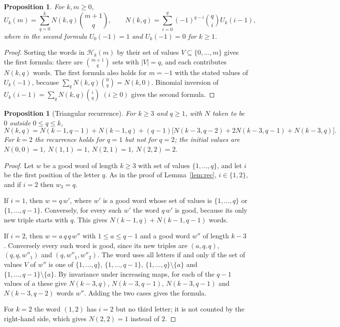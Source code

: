 \documentclass[11pt]{amsart}
\newtheorem{proposition}[theorem]{Proposition}
\theoremstyle{definition}
\begin{document}
\begin{proposition}\label{prop:Nbasis}
For $k,m\ge0$,
\begin{equation}\label{eq:Nbasis}
  U_k(m)=\sum_{q=0}^{k}N(k,q)\binom{m+1}{q},\qquad N(k,q)=\sum_{i=0}^{q}(-1)^{q-i}\binom{q}{i}U_k(i-1),
\end{equation}
where in the second formula $U_0(-1)=1$ and $U_k(-1)=0$ for $k\ge1$.
\end{proposition}

\begin{proof}
Sorting the words in $\mathcal H_k(m)$ by their set of values $V\subseteq\{0,\dots,m\}$ gives the first formula: there are $\binom{m+1}{q}$ sets with $|V|=q$, and each contributes $N(k,q)$ words. The first formula also holds for $m=-1$ with the stated values of $U_k(-1)$, because $\sum_qN(k,q)\binom{0}{q}=N(k,0)$. Binomial inversion of $U_k(i-1)=\sum_qN(k,q)\binom{i}{q}$ $(i\ge0)$ gives the second formula.
\end{proof}

\begin{proposition}[Triangular recurrence]\label{prop:Ntri}
For $k\ge3$ and $q\ge1$, with $N$ taken to be $0$ outside $0\le q\le k$,
\[
  N(k,q)=N(k-1,q-1)+N(k-1,q)+(q-1)\bigl[N(k-3,q-2)+2N(k-3,q-1)+N(k-3,q)\bigr].
\]
For $k=2$ the recurrence holds for $q=1$ but not for $q=2$; the initial values are $N(0,0)=1$, $N(1,1)=1$, $N(2,1)=1$, $N(2,2)=2$.
\end{proposition}

\begin{proof}
Let $w$ be a good word of length $k\ge3$ with set of values $\{1,\dots,q\}$, and let $i$ be the first position of the letter $q$. As in the proof of Lemma~\ref{lem:rec}, $i\in\{1,2\}$, and if $i=2$ then $w_3=q$.

If $i=1$, then $w=q\,w'$, where $w'$ is a good word whose set of values is $\{1,\dots,q\}$ or $\{1,\dots,q-1\}$. Conversely, for every such $w'$ the word $q\,w'$ is good, because its only new triple starts with $q$. This gives $N(k-1,q)+N(k-1,q-1)$ words.

If $i=2$, then $w=a\,q\,q\,w''$ with $1\le a\le q-1$ and a good word $w''$ of length $k-3$. Conversely every such word is good, since its new triples are $(a,q,q)$, $(q,q,w''_1)$ and $(q,w''_1,w''_2)$. The word uses all letters if and only if the set of values $V$ of $w''$ is one of $\{1,\dots,q\}$, $\{1,\dots,q-1\}$, $\{1,\dots,q\}\setminus\{a\}$ and $\{1,\dots,q-1\}\setminus\{a\}$. By invariance under increasing maps, for each of the $q-1$ values of $a$ these give $N(k-3,q)$, $N(k-3,q-1)$, $N(k-3,q-1)$ and $N(k-3,q-2)$ words $w''$. Adding the two cases gives the formula.

For $k=2$ the word $(1,2)$ has $i=2$ but no third letter; it is not counted by the right-hand side, which gives $N(2,2)=1$ instead of $2$.
\end{proof}
\end{document}
